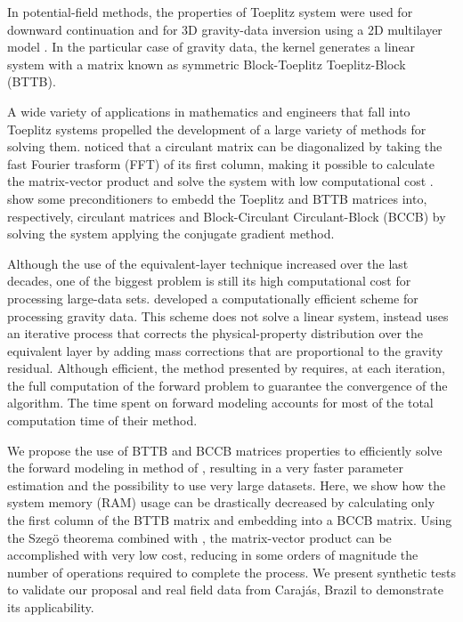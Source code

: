 \documentclass[manuscript,revised]{geophysics}
\begin{document}
In potential-field methods, the properties of Toeplitz system were used for downward continuation \citep{zhang-etal2016} and for 3D gravity-data inversion using a 2D multilayer model \citep{zhang-wong2015}. In the particular case of gravity data, the kernel generates a linear system with a matrix known as symmetric Block-Toeplitz Toeplitz-Block (BTTB).

A wide variety of applications in mathematics and engineers that fall into Toeplitz systems propelled the development of a large variety of  methods for solving them. %
\citet{grenander-szego1984} noticed that a circulant matrix can be diagonalized by taking the fast Fourier trasform (FFT) of its first column, making it possible to calculate the matrix-vector product and solve the system with low computational cost \citep{strang-aarikka1986, olkin1986}. \citet{chan-jin2007} show some preconditioners to embedd the Toeplitz and BTTB matrices into, respectively, circulant matrices and Block-Circulant Circulant-Block (BCCB) by solving the system applying the conjugate gradient method.

Although the use of the equivalent-layer technique increased over the last decades, one of the biggest problem is still its high computational cost for processing large-data sets. \citet{siqueira-etal2017} developed a computationally efficient scheme for processing gravity data. This scheme does not solve a linear system, instead uses an iterative process that corrects the physical-property distribution over the equivalent layer by adding mass corrections that are proportional to the gravity residual. Although efficient, the method presented by \citet{siqueira-etal2017} requires, at each iteration,  the full computation of the forward problem to guarantee the convergence of the algorithm. The time spent on forward modeling accounts for most of the total computation time of their method.

We propose the use of BTTB and BCCB matrices properties to efficiently  solve the forward modeling in method of \citet{siqueira-etal2017}, resulting in a very faster parameter estimation and the possibility to use very large datasets. Here, we show how the system memory (RAM) usage can be drastically decreased by calculating only the first column of the BTTB matrix and embedding into a BCCB matrix. Using the Szeg\"{o} theorema  combined with \cite{strang-aarikka1986}, the matrix-vector product can be accomplished with very low cost, reducing in some orders of magnitude the number of operations required to complete the process. We present synthetic tests to validate our proposal and real field data from Caraj\'as, Brazil to demonstrate its applicability.
\end{document}
